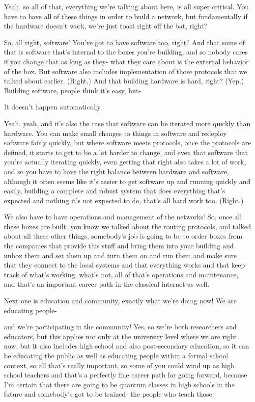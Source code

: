 Yeah, so all of that, everything we're talking about here, is all super critical. You have to have all of these things in order to build a network, but fundamentally if the hardware doesn't work, we're just toast right off the bat, right?

So, all right, software! You've got to have software too, right? And that some of that is software that's internal to the boxes you're building, and so nobody cares if you change that as long as they- what they care about is the external behavior of the box. But software also includes implementation of those protocols that we talked about earlier. (Right.) And that building hardware is hard, right? (Yep.) Building software, people think it's easy, but-

It doesn't happen automatically.

Yeah, yeah, and it's also the case that software can be iterated more quickly than hardware. You can make small changes to things in software and redeploy software fairly quickly, but where software meets protocols, once the protocols are defined, it starts to get to be a lot harder to change, and even that software that you're actually iterating quickly, even getting that right also takes a lot of work, and so you have to have the right balance between hardware and software, although it often seems like it's easier to get software up and running quickly and easily, building a complete and robust system that does everything that's expected and nothing it's not expected to do, that's all hard work too. (Right.)

We also have to have operations and management of the networks! So, once all these boxes are built, you know we talked about the routing protocols, and talked about all these other things, somebody's job is going to be to order boxes from the companies that provide this stuff and bring them into your building and unbox them and set them up and turn them on and run them and make sure that they connect to the local systems and that everything works and that keep track of what's working, what's not, all of that's operations and maintenance, and that's an important career path in the classical internet as well.

Next one is education and community, exactly what we're doing now! We are educating people-

and we're participating in the community! Yes, so we're both researchers and educators, but this applies not only at the university level where we are right now, but it also includes high school and also post-secondary education, so it can be educating the public as well as educating people within a formal school context, so all that's really important, so some of you could wind up as high school teachers and that's a perfectly fine career path for going forward, because I'm certain that there are going to be quantum classes in high schools in the future and somebody's got to be trained- the people who teach those.

